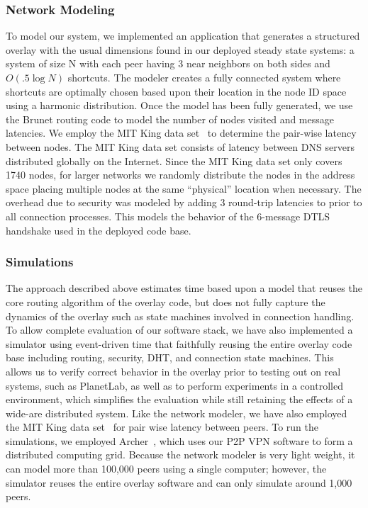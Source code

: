 \documentclass[conference]{IEEEtran}
\begin{document}
\subsubsection{Network Modeling}
To model our system, we implemented an application that generates a structured
overlay with the usual dimensions found in our deployed steady state systems:
a system of size N with each peer having 3 near neighbors on both sides and
$O(.5\log N)$ shortcuts.  The modeler creates a fully connected system where
shortcuts are optimally chosen based upon their location in the node ID space
using a harmonic distribution.  Once the model has been fully generated, we use
the Brunet routing code to model the number of
nodes visited and message latencies.  We employ
the MIT King data set~\cite{king_data} to determine the pair-wise latency
between nodes.  The MIT King data set consists of latency between DNS servers
distributed globally on the Internet.  Since the MIT King data set only covers
1740 nodes, for larger networks we randomly distribute the nodes in the address space placing
multiple nodes at the same ``physical'' location when necessary. The overhead due to security
was modeled by adding 3 round-trip latencies to prior to all connection
processes. This models the behavior of the 6-message DTLS handshake used in
the deployed code base.

\subsubsection{Simulations}
The approach described above estimates time based upon a model 
that reuses the core routing algorithm of the overlay code, but does not fully capture 
the dynamics of the overlay such as state machines involved in connection handling.  To allow complete
evaluation of our software stack, we have also implemented a simulator using
event-driven time that faithfully reusing the entire overlay code base including
routing, security, DHT, and connection state machines.  This allows us
to verify correct behavior in the overlay prior to testing out on real systems,
such as PlanetLab, as well as to perform experiments in a controlled
environment, which simplifies the evaluation while still retaining the effects
of a wide-are distributed system.  Like the network modeler, we have also employed
the MIT King data set~\cite{king_data} for pair wise latency between peers.
To run the simulations, we employed Archer~\cite{archer}, which uses our P2P
VPN software to form a distributed computing grid.
Because the network modeler is very
light weight, it can model more than 100,000 peers using a single computer;
however, the simulator reuses the entire overlay software and can only simulate
around 1,000 peers.
\end{document}
